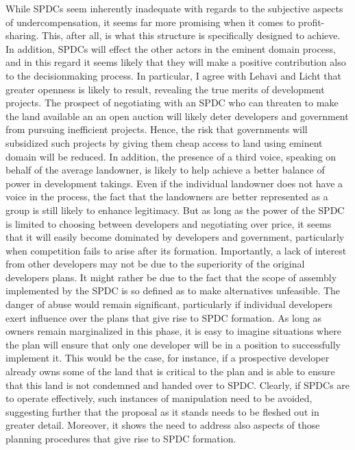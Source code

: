 While SPDCs seem inherently inadequate with regards to the subjective aspects of undercompensation, it seems far more promising when it comes to profit-sharing. This, after all, is what this structure is specifically designed to achieve. In addition, SPDCs will effect the other actors in the eminent domain process, and in this regard it seems likely that they will make a positive contribution also to the decisionmaking process. In particular, I agree with Lehavi and Licht that greater openness is likely to result, revealing the true merits of development projects. The prospect of negotiating with an SPDC who can threaten to make the land available an an open auction will likely deter developers and government from pursuing inefficient projects. Hence, the risk that governments will subsidized such projects by giving them cheap access to land using eminent domain will be reduced. In addition, the presence of a third voice, speaking on behalf of the average landowner, is likely to help achieve a better balance of power in development takings. Even if the individual landowner does not have a voice in the process, the fact that the landowners are better represented as a group is still likely to enhance legitimacy. But as long as the power of the SPDC is limited to choosing between developers and negotiating over price, it seems that it will easily become dominated by developers and government, particularly when competition fails to arise after its formation. Importantly, a lack of interest from other developers may not be due to the superiority of the original developers plans. It might rather be due to the fact that the scope of assembly implemented by the SPDC is so defined as to make alternatives unfeasible. The danger of abuse would remain significant, particularly if individual developers exert influence over the plans that give rise to SPDC formation. As long as owners remain marginalized in this phase, it is easy to imagine situations where the plan will ensure that only one developer will be in a position to successfully implement it. This would be the case, for instance, if a prospective developer already owns some of the land that is critical to the plan and is able to ensure that this land is not condemned and handed over to SPDC. Clearly, if SPDCs are to operate effectively, such instances of manipulation need to be avoided, suggesting further that the proposal as it stands needs to be fleshed out in greater detail. Moreover, it shows the need to address also aspects of those planning procedures that give rise to SPDC formation.

